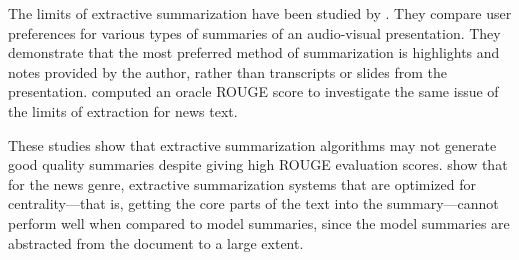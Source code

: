 The limits of extractive summarization have been studied by . They compare user preferences for various types of summaries of an audio-visual presentation. They demonstrate that the most preferred method of summarization is highlights and notes provided by the author, rather than transcripts or slides from the presentation.  computed an oracle ROUGE score to investigate the same issue of the limits of extraction for news text. 

These studies show that extractive summarization algorithms may not generate good quality summaries despite giving high ROUGE evaluation scores.  show that for the news genre, extractive summarization systems that are optimized for centrality---that is, getting the core parts of the text into the summary---cannot perform well when compared to model summaries, since the model summaries are abstracted from the document to a large extent.
